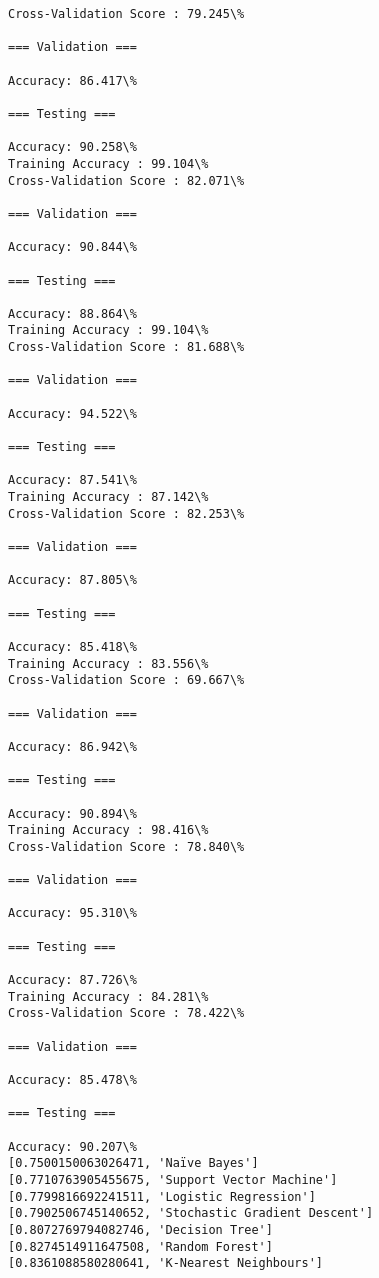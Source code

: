 \documentclass[11pt]{article}
\begin{document}
    \begin{Verbatim}[commandchars=\\\{\}]
Cross-Validation Score : 79.245\%

=== Validation ===

Accuracy: 86.417\%

=== Testing ===

Accuracy: 90.258\%
Training Accuracy : 99.104\%
Cross-Validation Score : 82.071\%

=== Validation ===

Accuracy: 90.844\%

=== Testing ===

Accuracy: 88.864\%
Training Accuracy : 99.104\%
Cross-Validation Score : 81.688\%

=== Validation ===

Accuracy: 94.522\%

=== Testing ===

Accuracy: 87.541\%
Training Accuracy : 87.142\%
Cross-Validation Score : 82.253\%

=== Validation ===

Accuracy: 87.805\%

=== Testing ===

Accuracy: 85.418\%
Training Accuracy : 83.556\%
Cross-Validation Score : 69.667\%

=== Validation ===

Accuracy: 86.942\%

=== Testing ===

Accuracy: 90.894\%
Training Accuracy : 98.416\%
Cross-Validation Score : 78.840\%

=== Validation ===

Accuracy: 95.310\%

=== Testing ===

Accuracy: 87.726\%
Training Accuracy : 84.281\%
Cross-Validation Score : 78.422\%

=== Validation ===

Accuracy: 85.478\%

=== Testing ===

Accuracy: 90.207\%
[0.7500150063026471, 'Naïve Bayes']
[0.7710763905455675, 'Support Vector Machine']
[0.7799816692241511, 'Logistic Regression']
[0.7902506745140652, 'Stochastic Gradient Descent']
[0.8072769794082746, 'Decision Tree']
[0.8274514911647508, 'Random Forest']
[0.8361088580280641, 'K-Nearest Neighbours']

    \end{Verbatim}
\end{document}
